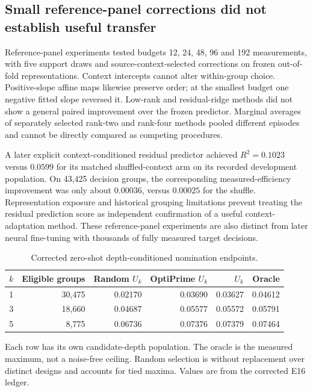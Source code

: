 \subsection{Small reference-panel corrections did not establish useful transfer}
Reference-panel experiments tested budgets 12, 24, 48, 96 and 192 measurements, with five support draws and source-context-selected corrections on frozen out-of-fold representations. Context intercepts cannot alter within-group choice. Positive-slope affine maps likewise preserve order; at the smallest budget one negative fitted slope reversed it. Low-rank and residual-ridge methods did not show a general paired improvement over the frozen predictor. Marginal averages of separately selected rank-two and rank-four methods pooled different episodes and cannot be directly compared as competing procedures.

A later explicit context-conditioned residual predictor achieved $R^2=0.1023$ versus $0.0599$ for its matched shuffled-context arm on its recorded development population. On 43,425 decision groups, the corresponding measured-efficiency improvement was only about $0.00036$, versus $0.00025$ for the shuffle. Representation exposure and historical grouping limitations prevent treating the residual prediction score as independent confirmation of a useful context-adaptation method. These reference-panel experiments are also distinct from later neural fine-tuning with thousands of fully measured target decisions.

\begin{table}[htbp]
\centering\small
\caption{Corrected zero-shot depth-conditioned nomination endpoints.}
\label{tab:depth}
\begin{tabular}{rrrrrr}
\toprule
$k$ & Eligible groups & Random $U_k$ & OptiPrime $U_k$ & \model{} $U_k$ & Oracle \\
\midrule
1 & 30,475 & 0.02170 & 0.03690 & 0.03627 & 0.04612 \\
3 & 18,660 & 0.04687 & 0.05577 & 0.05572 & 0.05791 \\
5 & 8,775 & 0.06736 & 0.07376 & 0.07379 & 0.07464 \\
\bottomrule
\end{tabular}
\par\smallskip\begin{minipage}{\linewidth}\footnotesize
Each row has its own candidate-depth population. The oracle is the measured maximum, not a noise-free ceiling. Random selection is without replacement over distinct designs and accounts for tied maxima. Values are from the corrected E16 ledger.
\end{minipage}
\end{table}

